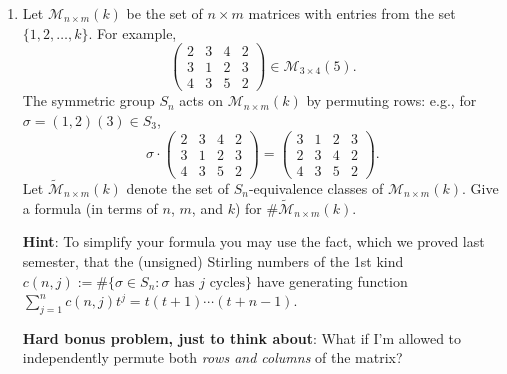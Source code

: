 \documentclass[11pt]{article}
\begin{document}
\begin{enumerate}
\item Let $\mathcal{M}_{n \times m}(k)$ be the set of $n \times m$ matrices with entries from the set $\{1,2,\ldots,k\}$. For example,
\[ \begin{pmatrix} 2 & 3 & 4 & 2 \\
3 & 1 & 2 & 3 \\
4 & 3 & 5 & 2 \end{pmatrix} \in \mathcal{M}_{3 \times 4}(5).\]
The symmetric group $S_n$ acts on $\mathcal{M}_{n \times m}(k)$ by permuting rows: e.g., for $\sigma = (1,2)(3) \in S_3$,
\[ \sigma \cdot \begin{pmatrix} 2 & 3 & 4 & 2 \\
3 & 1 & 2 & 3 \\
4 & 3 & 5 & 2 \end{pmatrix} = \begin{pmatrix} 3 & 1 & 2 & 3 \\
2 & 3 & 4 & 2 \\
4 & 3 & 5 & 2 \end{pmatrix} .\]
Let $\widetilde{\mathcal{M}}_{n \times m}(k)$ denote the set of $S_n$-equivalence classes of $\mathcal{M}_{n \times m}(k)$.  Give a formula (in terms of $n$, $m$, and $k$) for $\#\widetilde{\mathcal{M}}_{n \times m}(k)$.

{\bf Hint}: To simplify your formula you may use the fact, which we proved last semester, that the (unsigned) Stirling numbers of the 1st kind $c(n,j) := \# \{\sigma \in S_n\colon \textrm{$\sigma$ has $j$ cycles}\}$ have generating function $\sum_{j=1}^{n} c(n,j)t^j = t(t+1)\cdots (t+n-1)$.

{\bf Hard bonus problem, just to think about}: What if I'm allowed to independently permute both \emph{rows and columns} of the matrix?

\end{enumerate}
\end{document}
